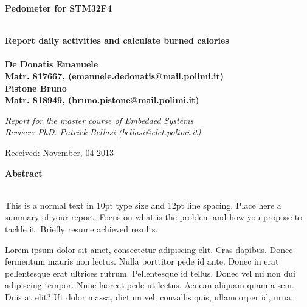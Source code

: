 \documentclass[a4paper,10pt]{article}
\newenvironment*{mytitle}{\begin{LARGE}\bf}{\end{LARGE}\\}%
\newenvironment*{mysubtitle}{\bf}{\\[1.5ex]}%
\newenvironment*{myabstract}{\begin{Large}\bf}{\end{Large}\\[2.5ex]}%
\begin{document}
\begin{mytitle}Pedometer for STM32F4\end{mytitle}
\begin{mysubtitle}Report daily activities and calculate burned calories\end{mysubtitle}
%
%
\\
De Donatis Emanuele\\
Matr. 817667, (emanuele.dedonatis@mail.polimi.it)\\
\hspace{10ex}
Pistone Bruno\\
Matr. 818949, (bruno.pistone@mail.polimi.it)\\
\begin{flushright}
\emph{Report for the master course of Embedded Systems}\\
\emph{Reviser: PhD. Patrick Bellasi (bellasi@elet.polimi.it)}
\end{flushright}

Received: November, 04 2013\\
\hspace{10ex}

\begin{myabstract} Abstract \end{myabstract}
This is a normal text in 10pt type size and 12pt line spacing.
Place here a summary of your report. Focus on what is the problem and how you
propose to tackle it. Briefly resume achieved results.

Lorem ipsum dolor sit amet, consectetur adipiscing elit. Cras dapibus. Donec
fermentum mauris non lectus. Nulla porttitor pede id ante. Donec in erat
pellentesque erat ultrices rutrum. Pellentesque id tellus. Donec vel mi non dui
adipiscing tempor.  Nunc laoreet pede ut lectus. Aenean aliquam quam a sem. Duis
at elit? Ut dolor massa, dictum vel; convallis quis, ullamcorper id, urna.
\end{document}
